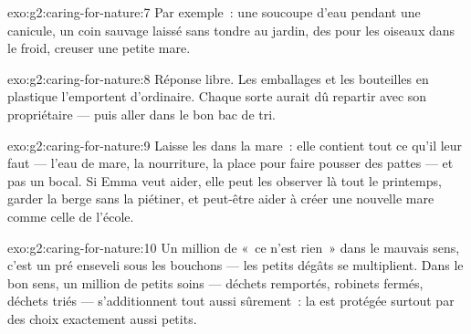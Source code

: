 \begin{solution}{exo:g2:caring-for-nature:7}
Par exemple~: une soucoupe d'eau pendant une canicule, un coin
sauvage laissé sans tondre au jardin, des  pour les oiseaux
dans le froid, creuser une petite mare.
\end{solution}

\begin{solution}{exo:g2:caring-for-nature:8}
Réponse libre. Les emballages et les bouteilles en plastique
l'emportent d'ordinaire. Chaque sorte aurait dû repartir avec son
propriétaire --- puis aller dans le bon bac de tri.
\end{solution}

\begin{solution}{exo:g2:caring-for-nature:9}
Laisse les  dans la mare~: elle contient tout ce qu'il leur
faut --- l'eau de mare, la nourriture, la place pour faire pousser
des pattes --- et pas un bocal. Si Emma veut aider, elle peut les
observer là tout le printemps, garder la berge sans la piétiner, et
peut-être aider à créer une nouvelle mare comme celle de l'école.
\end{solution}

\begin{solution}{exo:g2:caring-for-nature:10}
Un million de «~ce n'est rien~» dans le mauvais sens, c'est un pré
enseveli sous les bouchons --- les petits dégâts se multiplient.
Dans le bon sens, un million de petits soins --- déchets remportés,
robinets fermés, déchets triés --- s'additionnent tout aussi sûrement~:
la  est protégée surtout par des choix exactement aussi petits.
\end{solution}
